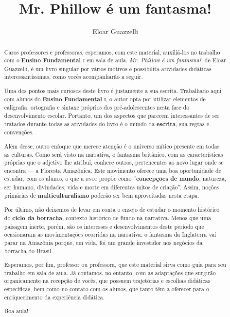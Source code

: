 \documentclass[11pt]{extarticle}
\newcommand{\AutorLivro}{Eloar Guazzelli}
\newcommand{\TituloLivro}{Mr. Phillow é um fantasma!}
\newcommand{\colaborador}{Renier Silva}
\begin{document}
\title{\TituloLivro}
\author{\AutorLivro}
\def\authornotes{\colaborador}

\date{}
\maketitle


\tableofcontents




\begin{abstract}

Caros professores e professoras, esperamos, com este material,
auxiliá-los no trabalho com o \textbf{Ensino Fundamental \textsc{i}} em sala de aula.
\textit{Mr. Phillow é um fantasma!}, de Eloar Guazzelli, é um livro singular
por vários motivos e possibilita atividades didáticas interessantíssimas,
como vocês acompanharão a seguir.

Uma dos pontos mais curiosos deste livro é justamente a sua escrita.
Trabalhado aqui com alunos do \textbf{Ensino Fundamental \textsc{i}},
o autor opta por utilizar elementos de caligrafia, ortografia e sintaxe 
próprios dos pré-adolescentes nesta fase do desenvolvimento escolar.
Portanto, um dos aspectos que parecem interessantes de ser tratados durante
todas as atividades do livro é o mundo da \textbf{escrita}, sua regras
e convenções.

Além desse, outro enfoque que merece atenção é o universo mítico presente
em todas as culturas. Como será visto na narrativa, o fantasma britânico,
com as características próprias que o adjetivo lhe atribui, conhece
outros, pertencentes ao novo lugar onde se encontra --- a Floresta Amazônica.
Este movimento oferece uma boa oportunidade de estudar, com os alunos, 
o que a \textsc{bncc} propõe como ``\textbf{concepções de mundo}, natureza, ser humano, 
divindades, vida e morte em diferentes mitos de criação''. Assim, 
noções primárias de \textbf{multiculturalismo} poderão ser bem aproveitadas
nesta etapa.

Por último, não deixemos de levar em conta o ensejo de estudar o momento
histórico do \textbf{ciclo da borracha}, contexto histórico de fundo 
na narrativa. Menos que uma paisagem inerte, porém, são os interesses
e desenvolvimentos deste período que ocasionaram as movimentações
ocorridas na narrativa: o fantasma da Inglaterra vai parar na Amazônia
porque, em vida, foi um grande investidor nos negócios da borracha do Brasil. 

Esperamos, por fim, professor ou professora, que este material sirva como guia 
para seu trabalho em sala de aula. Já contamos, no entanto, com as adaptações
que surgirão organicamente na recepção de vocês, que possuem 
trajetórias e escolhas didáticas específicas, bem como no contato com os 
alunos, que tanto têm a oferecer para o enriquecimento da experiência didática. 

Boa aula!

\end{abstract}
\end{document}
